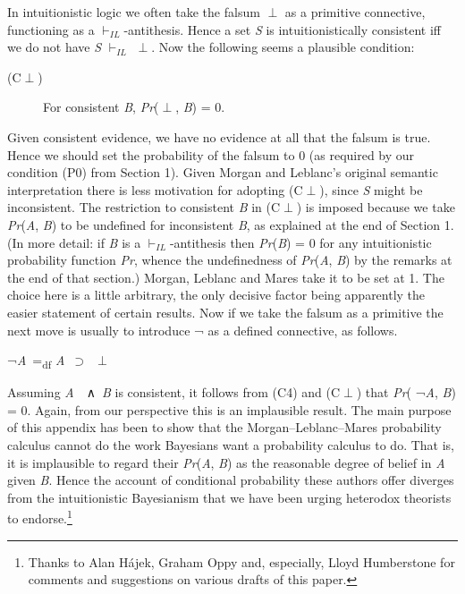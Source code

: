 \documentclass[
  10pt,
  letterpaper,
  DIV=11,
  numbers=noendperiod,
  twoside]{scrartcl}
\begin{document}
In intuitionistic logic we often take the falsum \({\perp}\) as a
primitive connective, functioning as a \(\vdash_{IL}\)-antithesis. Hence
a set \emph{S} is intuitionistically consistent iff we do not have
\emph{S} \(\vdash_{IL}\) \({\perp}\). Now the following seems a
plausible condition:

\begin{description}
\item[(C\({\perp}\))]
For consistent \emph{B}, \emph{Pr}(\({\perp}\), \emph{B}) = 0.
\end{description}

Given consistent evidence, we have no evidence at all that the falsum is
true. Hence we should set the probability of the falsum to 0 (as
required by our condition (P0) from Section 1). Given Morgan and
Leblanc's original semantic interpretation there is less motivation for
adopting (C\({\perp}\)), since \emph{S} might be inconsistent. The
restriction to consistent \emph{B} in (C\({\perp}\)) is imposed because
we take \emph{Pr}(\emph{A}, \emph{B}) to be undefined for inconsistent
\emph{B}, as explained at the end of Section 1. (In more detail: if
\emph{B} is a \(\vdash_{IL}\)-antithesis then \emph{Pr}(\emph{B}) = 0
for any intuitionistic probability function \emph{Pr}, whence the
undefinedness of \emph{Pr}(\emph{A}, \emph{B}) by the remarks at the end
of that section.) Morgan, Leblanc and Mares take it to be set at 1. The
choice here is a little arbitrary, the only decisive factor being
apparently the easier statement of certain results. Now if we take the
falsum as a primitive the next move is usually to introduce ¬ as a
defined connective, as follows.

¬\emph{A}~=\textsubscript{df} \emph{A}~\({\supset}\)~\({\perp}\)

Assuming \emph{A}~~∧~\emph{B} is consistent, it follows from (C4) and
(C\({\perp}\)) that \emph{Pr}( ¬\emph{A}, \emph{B}) = 0. Again, from our
perspective this is an implausible result. The main purpose of this
appendix has been to show that the Morgan--Leblanc--Mares probability
calculus cannot do the work Bayesians want a probability calculus to do.
That is, it is implausible to regard their \emph{Pr}(\emph{A}, \emph{B})
as the reasonable degree of belief in \emph{A} given \emph{B}. Hence the
account of conditional probability these authors offer diverges from the
intuitionistic Bayesianism that we have been urging heterodox theorists
to endorse.\footnote{Thanks to Alan Hájek, Graham Oppy and, especially,
  Lloyd Humberstone for comments and suggestions on various drafts of
  this paper.}
\end{document}

